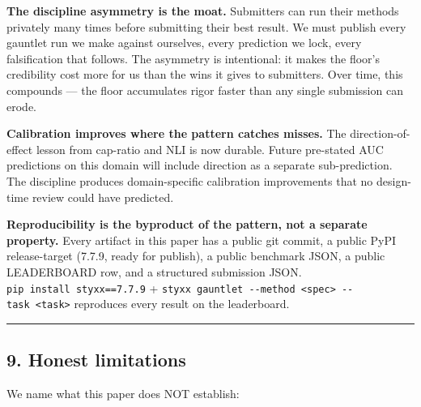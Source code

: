 \documentclass[
]{article}
\begin{document}
\textbf{The discipline asymmetry is the moat.} Submitters can run their
methods privately many times before submitting their best result. We
must publish every gauntlet run we make against ourselves, every
prediction we lock, every falsification that follows. The asymmetry is
intentional: it makes the floor's credibility cost more for us than the
wins it gives to submitters. Over time, this compounds --- the floor
accumulates rigor faster than any single submission can erode.

\textbf{Calibration improves where the pattern catches misses.} The
direction-of-effect lesson from cap-ratio and NLI is now durable. Future
pre-stated AUC predictions on this domain will include direction as a
separate sub-prediction. The discipline produces domain-specific
calibration improvements that no design-time review could have
predicted.

\textbf{Reproducibility is the byproduct of the pattern, not a separate
property.} Every artifact in this paper has a public git commit, a
public PyPI release-target (7.7.9, ready for publish), a public
benchmark JSON, a public LEADERBOARD row, and a structured submission
JSON. \texttt{pip\ install\ styxx==7.7.9} +
\texttt{styxx\ gauntlet\ -\/-method\ \textless{}spec\textgreater{}\ -\/-task\ \textless{}task\textgreater{}}
reproduces every result on the leaderboard.

\begin{center}\rule{0.5\linewidth}{0.5pt}\end{center}

\subsection{9. Honest limitations}\label{honest-limitations}

We name what this paper does NOT establish:
\end{document}
